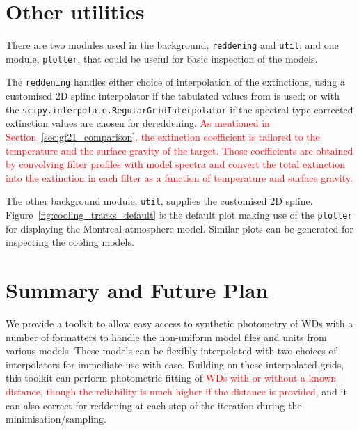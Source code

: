 \documentclass[fleqn,usenatbib]{rasti}
\begin{document}
\section{Other utilities}
\label{sec:utility}
There are two modules used in the background, \texttt{reddening} and
\texttt{util}; and one module, \texttt{plotter}, that could be useful for
basic inspection of the models. 

The \texttt{reddening} handles either choice of interpolation of the
extinctions, using a customised 2D spline interpolator if the tabulated values
from \citet{2011ApJ...737..103S} is used; or with the
\verb+scipy.interpolate.RegularGridInterpolator+ if the spectral type corrected
extinction values are chosen for dereddening. \textcolor{red}{As mentioned in
Section~\ref{sec:gf21_comparison}, the extinction coefficient is tailored to the
temperature and the surface gravity of the target. Those coefficients are
obtained by convolving filter profiles with model spectra and convert the
total extinction into the extinction in each filter as a function of
temperature and surface gravity.}

The other background module, \texttt{util}, supplies the customised 2D spline.
Figure~\ref{fig:cooling_tracks_default} is the default plot making use of the
\texttt{plotter} for displaying the Montreal atmosphere model. Similar
plots can be generated for inspecting the cooling models.

\section{Summary and Future Plan}
We provide a toolkit to allow easy access to synthetic photometry of WDs with
a number of formatters to handle the non-uniform model files and units from
various models. These models can be flexibly interpolated with two choices of
interpolators for immediate use with ease. Building on these interpolated
grids, this toolkit can perform photometric fitting of \textcolor{red}{WDs with
or without a known distance, though the reliability is much higher if the distance is provided,} and
it can also correct for reddening at each step of the iteration during the
minimisation/sampling.
\end{document}
